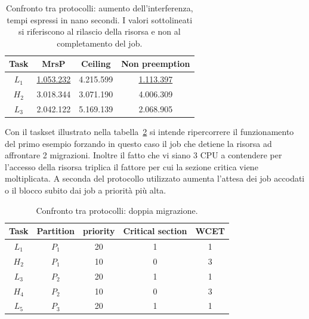 \begin{table}
  \centering
  \begin{tabular}{cccc}
  \hline\hline
    Task & MrsP & Ceiling & Non preemption \\ \hline
    $L_1$ & \underline{1.053.232} & 4.215.599 & \underline{1.113.397} \\
    $H_2$ & 3.018.344 & 3.071.190 & 4.006.309 \\
    $L_3$ & 2.042.122 & 5.169.139 & 2.068.905 \\
    \hline
    \end{tabular}
    \caption{Confronto tra protocolli: aumento dell'interferenza, tempi espressi in nano secondi. I valori sottolineati si riferiscono al rilascio della risorsa e non al completamento del job.}
  \label{tab:test_protocols_Taskset3_ris}
  \end{table}

Con il taskset illustrato nella tabella~\ref{tab:test_protocols_Taskset4} si intende ripercorrere il funzionamento del primo esempio forzando in questo caso il job che detiene la risorsa ad affrontare 2 migrazioni. Inoltre il fatto che vi siano 3 CPU a contendere per l'accesso della risorsa triplica il fattore per cui la sezione critica viene moltiplicata. A seconda del protocollo utilizzato aumenta l'attesa dei job accodati o il blocco subito dai job a priorità più alta.\\

\begin{table}
  \centering
  \begin{tabular}{ccccc}
  \hline\hline
    Task & Partition     & priority & Critical section & WCET  \\ \hline
    $L_1$ & $P_1$  & 20 & 1 & 1 \\
    $H_2$ & $P_1$  & 10 & 0 & 3 \\
    $L_3$ & $P_2$  & 20 & 1 & 1 \\
    $H_4$ & $P_2$  & 10 & 0 & 3 \\
    $L_5$ & $P_3$  & 20 & 1 & 1 \\
    \hline
    \end{tabular}
    \caption{Confronto tra protocolli: doppia migrazione.}
  \label{tab:test_protocols_Taskset4}
  \end{table}

